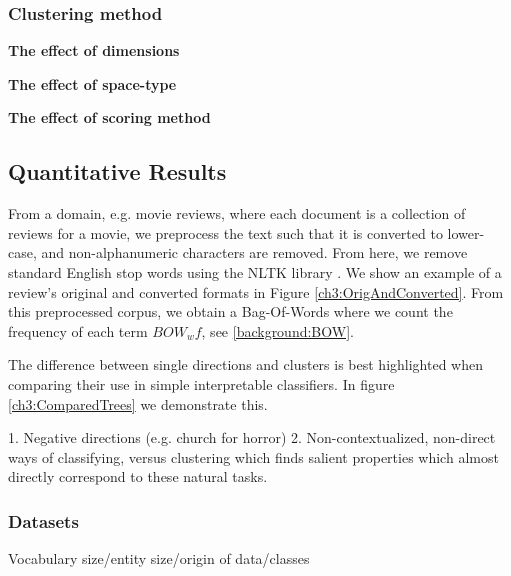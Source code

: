 \subsubsection{Clustering method}

\textbf{The effect of dimensions}


\textbf{The effect of space-type}

\textbf{The effect of scoring method}

\subsection{Quantitative Results}
From a domain, e.g. movie reviews, where each document is a collection of reviews for a movie, we preprocess the text such that it is converted to lower-case, and non-alphanumeric characters are removed. From here, we remove standard English stop words using the NLTK library \cite{Bird}. We show an example of a review's original and converted formats in Figure \ref{ch3:OrigAndConverted}. From this preprocessed corpus, we obtain a Bag-Of-Words where we count the frequency of each term $BOW_wf$, see \ref{background:BOW}. 

The difference between single directions and clusters is best highlighted when comparing their use in simple interpretable classifiers. In figure \ref{ch3:ComparedTrees} we demonstrate this.

1. Negative directions (e.g. church for horror)
2. Non-contextualized, non-direct ways of classifying, versus clustering which finds salient properties which almost directly correspond to these natural tasks.



\subsubsection{Datasets}

Vocabulary size/entity size/origin of data/classes

